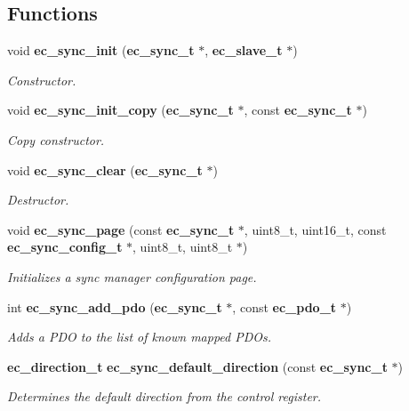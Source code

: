 \subsection*{Functions}
\begin{DoxyCompactItemize}
\item 
void {\bf ec\-\_\-sync\-\_\-init} ({\bf ec\-\_\-sync\-\_\-t} $\ast$, {\bf ec\-\_\-slave\-\_\-t} $\ast$)\label{sync_8h_a29f4dd145455097fef860bdd3c5a8de9}

\begin{DoxyCompactList}\small\item\em Constructor. \end{DoxyCompactList}\item 
void {\bf ec\-\_\-sync\-\_\-init\-\_\-copy} ({\bf ec\-\_\-sync\-\_\-t} $\ast$, const {\bf ec\-\_\-sync\-\_\-t} $\ast$)\label{sync_8h_a31f2b633260698acdce16b652d72809b}

\begin{DoxyCompactList}\small\item\em Copy constructor. \end{DoxyCompactList}\item 
void {\bf ec\-\_\-sync\-\_\-clear} ({\bf ec\-\_\-sync\-\_\-t} $\ast$)\label{sync_8h_af97d18e6309cc3ea675995287713f8f0}

\begin{DoxyCompactList}\small\item\em Destructor. \end{DoxyCompactList}\item 
void {\bf ec\-\_\-sync\-\_\-page} (const {\bf ec\-\_\-sync\-\_\-t} $\ast$, uint8\-\_\-t, uint16\-\_\-t, const {\bf ec\-\_\-sync\-\_\-config\-\_\-t} $\ast$, uint8\-\_\-t, uint8\-\_\-t $\ast$)
\begin{DoxyCompactList}\small\item\em Initializes a sync manager configuration page. \end{DoxyCompactList}\item 
int {\bf ec\-\_\-sync\-\_\-add\-\_\-pdo} ({\bf ec\-\_\-sync\-\_\-t} $\ast$, const {\bf ec\-\_\-pdo\-\_\-t} $\ast$)
\begin{DoxyCompactList}\small\item\em Adds a P\-D\-O to the list of known mapped P\-D\-Os. \end{DoxyCompactList}\item 
{\bf ec\-\_\-direction\-\_\-t} {\bf ec\-\_\-sync\-\_\-default\-\_\-direction} (const {\bf ec\-\_\-sync\-\_\-t} $\ast$)
\begin{DoxyCompactList}\small\item\em Determines the default direction from the control register. \end{DoxyCompactList}\end{DoxyCompactItemize}


